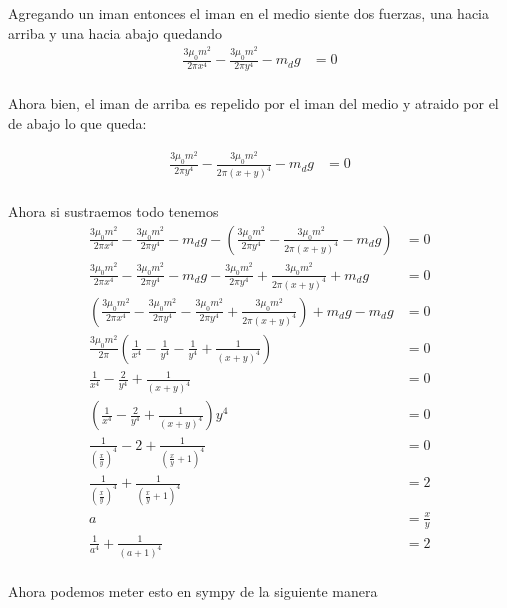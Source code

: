 \documentclass{report}
\begin{document}
\section{}

Agregando un iman entonces el iman en el medio siente dos fuerzas, una hacia arriba y una hacia abajo quedando
\begin{align*}
  \frac{3\mu_0 m^2}{2\pi x^4} -\frac{3\mu_0 m^2}{2\pi y^4} - m_d g &= 0\\
\end{align*}

Ahora bien, el iman de arriba es repelido por el iman del medio y atraido por el de abajo lo que queda:

\begin{align*}
  \frac{3\mu_0 m^2}{2\pi y^4} -\frac{3\mu_0 m^2}{2\pi (x + y)^4} - m_d g &= 0\\
\end{align*}

Ahora si sustraemos todo tenemos
\begin{align*}
  \frac{3\mu_0 m^2}{2\pi x^4} -\frac{3\mu_0 m^2}{2\pi y^4} - m_d g  - \left(\frac{3\mu_0 m^2}{2\pi y^4} -\frac{3\mu_0 m^2}{2\pi (x + y)^4} - m_d g\right) &= 0\\
  \frac{3\mu_0 m^2}{2\pi x^4} -\frac{3\mu_0 m^2}{2\pi y^4} - m_d g  - \frac{3\mu_0 m^2}{2\pi y^4} + \frac{3\mu_0 m^2}{2\pi (x + y)^4} + m_d g &= 0\\
  \left(\frac{3\mu_0 m^2}{2\pi x^4} -\frac{3\mu_0 m^2}{2\pi y^4}   - \frac{3\mu_0 m^2}{2\pi y^4} + \frac{3\mu_0 m^2}{2\pi (x + y)^4}\right) + m_d g - m_d g &= 0\\
  \frac{3\mu_0 m^2}{2\pi} \left(\frac{1}{x^4} -\frac{1}{y^4}   - \frac{1}{y^4} + \frac{1}{(x + y)^4}\right) &= 0\\
  \frac{1}{x^4} - \frac{2}{y^4} + \frac{1}{(x + y)^4} &= 0\\
  \left(\frac{1}{x^4} - \frac{2}{y^4} + \frac{1}{(x + y)^4}\right)y^{4} &= 0\\
  \frac{1}{\left(\frac{x}{y}\right)^4} - 2 + \frac{1}{\left(\frac{x}{y} + 1\right)^4} &= 0\\
  \frac{1}{\left(\frac{x}{y}\right)^4} + \frac{1}{\left(\frac{x}{y} + 1\right)^4} &= 2\\
  a &= \frac{x}{y}\\
  \frac{1}{a^4} + \frac{1}{\left(a + 1\right)^4} &= 2\\
\end{align*}

Ahora podemos meter esto en sympy de la siguiente manera
\end{document}
